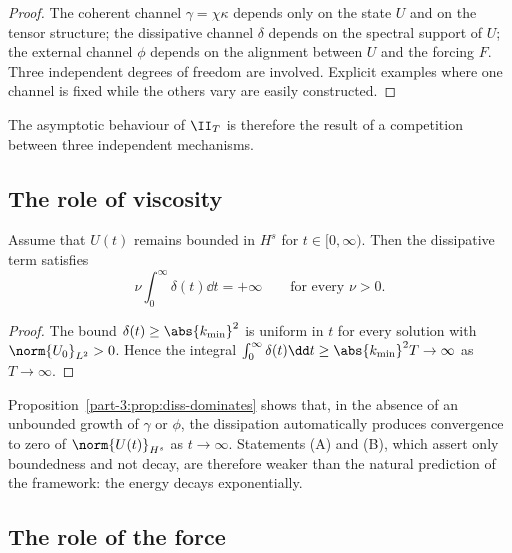 \begin{proof}
The coherent channel $\gamma = \chi\kappa$ depends only on the state 
$U$ and on the tensor structure; the dissipative channel $\delta$ 
depends on the spectral support of $U$; the external channel $\phi$ 
depends on the alignment between $U$ and the forcing $F$. Three 
independent degrees of freedom are involved. Explicit examples where 
one channel is fixed while the others vary are easily constructed.
\end{proof}

The asymptotic behaviour of $\II_T$ is therefore the result of a 
competition between three independent mechanisms.

\subsection{The role of viscosity}
\label{part-3:ssec:viscosity}

\begin{proposition}\label{part-3:prop:diss-dominates}
Assume that $U(t)$ remains bounded in $H^s$ for $t\in[0,\infty)$. Then 
the dissipative term satisfies
\begin{equation}\label{part-3:eq:diss-bound}
\nu\int_0^\infty\delta(t)\dd t = +\infty
\qquad\text{for every }\nu>0.
\end{equation}
\end{proposition}

\begin{proof}
The bound $\delta(t)\geq\abs{k_{\min}}^2$ is uniform in $t$ for every 
solution with $\norm{U_0}_{L^2}>0$. Hence the integral 
$\int_0^\infty\delta(t)\dd t\geq\abs{k_{\min}}^2 T\to\infty$ as 
$T\to\infty$.
\end{proof}

\begin{remark}\label{part-3:rem:viscous-obstr}
Proposition~\ref{part-3:prop:diss-dominates} shows that, in the absence of 
an unbounded growth of $\gamma$ or $\phi$, the dissipation 
automatically produces convergence to zero of $\norm{U(t)}_{H^s}$ 
as $t\to\infty$. Statements (A) and (B), which assert only 
boundedness and not decay, are therefore weaker than the natural 
prediction of the framework: the energy decays exponentially.
\end{remark}

\subsection{The role of the force}
\label{part-3:ssec:force}

